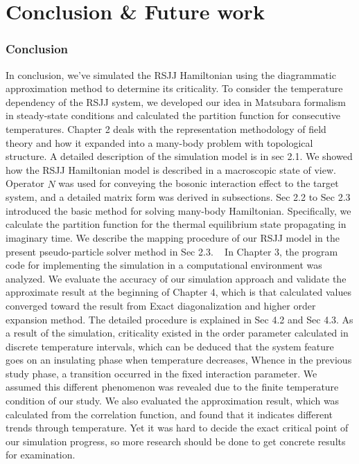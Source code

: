 \documentclass{article}[12pt]
\numberwithin{equation}{section}
\begin{document}
\section{Conclusion \& Future work}
\begin{spacing}{1.5}
\subsubsection*{Conclusion}
In conclusion, we’ve simulated the RSJJ Hamiltonian using the diagrammatic approximation method to determine its criticality. 
To consider the temperature dependency of the RSJJ system, we developed our idea in Matsubara formalism in steady-state conditions 
and calculated the partition function for consecutive temperatures. Chapter 2 deals with the representation methodology of field theory 
and how it expanded into a many-body problem with topological structure. A detailed description of the simulation model is in sec 2.1. We showed how the RSJJ Hamiltonian model 
is described in a macroscopic state of view. Operator $\hat{N}$ was used for conveying the bosonic interaction effect to the target system, 
and a detailed matrix form was derived in subsections. Sec 2.2 to Sec 2.3 introduced 
the basic method for solving many-body Hamiltonian. Specifically, 
we calculate the partition function for the thermal equilibrium state propagating in imaginary time. 
We describe the mapping procedure of our RSJJ model in the present pseudo-particle solver method in Sec 2.3.  
  In Chapter 3, the program code for implementing the simulation in a computational environment 
was analyzed. We evaluate the accuracy of our simulation approach and validate the approximate result at the beginning of Chapter 4, 
which is that calculated values converged toward the result from Exact diagonalization and higher order expansion method. 
The detailed procedure is explained in Sec 4.2 and Sec 4.3. As a result of the simulation, 
criticality existed in the order parameter calculated in discrete temperature intervals, which can be deduced that the system feature goes on an insulating phase when temperature decreases, 
Whence in the previous study phase, a transition occurred in the fixed interaction parameter. 
We assumed this different phenomenon was revealed due to the finite temperature condition of our study. 
We also evaluated the approximation result, which was calculated from the correlation function, and found that it indicates different trends through temperature.
Yet it was hard to decide the exact critical point of our simulation progress, so more research should be done to get concrete results for examination. 

\end{spacing}
\end{document}

